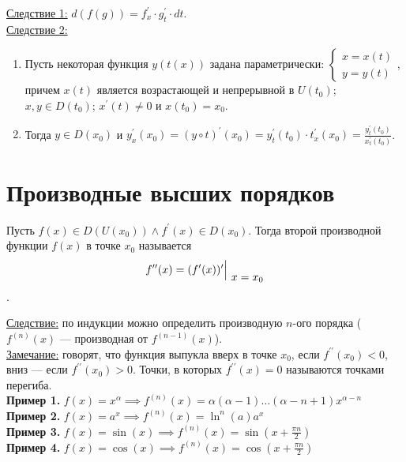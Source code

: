 \documentclass{article}
\begin{document}
\noindent\underline{Следствие 1:} \(d(f(g)) = f^{\prime}_x \cdot g^{\prime}_t \cdot dt\).\\[0.15cm]
\noindent \underline{Следствие 2:} 
\begin{enumerate}
\item Пусть некоторая функция \(y(t(x))\) задана параметрически:
\(\begin{cases}
    x = x(t)\\
    y = y(t)
\end{cases}\), причем \(x(t)\) является возрастающей и непрерывной в \(U(t_0)\); \(x, y \in D(t_0)\); \(x^{\prime}(t) \neq 0\) и \(x(t_0) = x_0\). 
\item Тогда \(y \in D(x_0)\) и \(\displaystyle y^{\prime}_x(x_0) = (y \circ t)^{\prime}(x_0) = y^{\prime}_t(t_0) \cdot t^{\prime}_x(x_0) = \frac{y^{\prime}_t(t_0)}{x^{\prime}_t(t_0)}\).
\end{enumerate}

\section*{Производные высших порядков}
\begin{definition}
    Пусть \(f(x) \in D(U(x_0)) \land f^{\prime}(x) \in D(x_0)\). Тогда второй производной функции \(f(x)\) в точке \(x_0\) называется \[f^{\prime\prime}(x) = \at{(f^{\prime}(x))^{\prime}}{x = x_0}\].    
\end{definition}
\noindent \underline{Следствие:} по индукции можно определить производную \(n\)-ого порядка (\(f^{(n)}(x)\) --- производная от \(f^{(n-1)}(x)\)).\\[0.15cm]
\noindent \underline{Замечание:} говорят, что функция выпукла вверх в точке \(x_0\), если \(f^{\prime\prime}(x_0) < 0\), вниз --- если \(f^{\prime\prime}(x_0) > 0\). Точки, в которых \(f^{\prime\prime}(x) = 0\) называются точками перегиба.\\[0.15cm]
\noindent \textbf{Пример 1.} \(\displaystyle f(x) = x^{\alpha} \implies f^{(n)}(x) = \alpha(\alpha - 1)\dots(\alpha - n + 1)x^{\alpha - n}\)\\[0.15cm]
\noindent \textbf{Пример 2.} \(\displaystyle f(x) = a^x \implies f^{(n)}(x) = \ln^n(a) a^x\)\\[0.15cm]
\noindent \textbf{Пример 3.} \(\displaystyle f(x) = \sin(x) \implies f^{(n)}(x) = \sin\left(x + \frac{\pi n}{2}\right)\)\\[0.15cm]
\noindent \textbf{Пример 4.} \(\displaystyle f(x) = \cos(x) \implies f^{(n)}(x) = \cos\left(x + \frac{\pi n}{2}\right)\)
\end{document}
